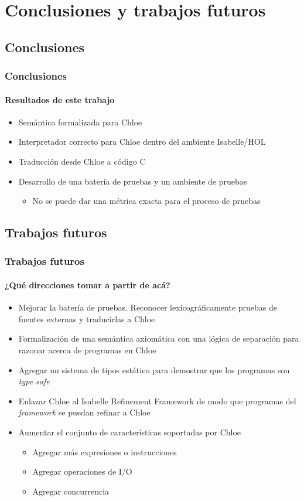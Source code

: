 \section{Conclusiones y trabajos futuros}


\subsection{Conclusiones}


\begin{frame}
\frametitle{Conclusiones}
\framesubtitle{Resultados de este trabajo}

\begin{itemize}
\item{Semántica formalizada para Chloe}
\item{Interpretador correcto para Chloe dentro del ambiente Isabelle/HOL}
\item{Traducción desde Chloe a código C}
\item{Desarrollo de una batería de pruebas y un ambiente de pruebas}
\begin{itemize}
\item{No se puede dar una métrica exacta para el proceso de pruebas}
\end{itemize}
\end{itemize}

\end{frame}


\subsection{Trabajos futuros}


\begin{frame}
\frametitle{Trabajos futuros}
\framesubtitle{¿Qué direcciones tomar a partir de acá?}

\begin{itemize}
\item{Mejorar la batería de pruebas. Reconocer lexicográficamente pruebas de fuentes externas y traducirlas a Chloe}
\item{Formalización de una semántica axiomática con una lógica de separación para razonar acerca de programas en Chloe}
\item{Agregar un sistema de tipos estático para demostrar que los programas son \textit{type safe}}
\item{Enlazar Chloe al Isabelle Refinement Framework de modo que programas del \textit{framework} se puedan refinar a Chloe}
\item{Aumentar el conjunto de características soportadas por Chloe}
\begin{itemize}
\item{Agregar más expresiones o instrucciones}
\item{Agregar operaciones de I/O}
\item{Agregar concurrencia}
\end{itemize}
\end{itemize}


\end{frame}
